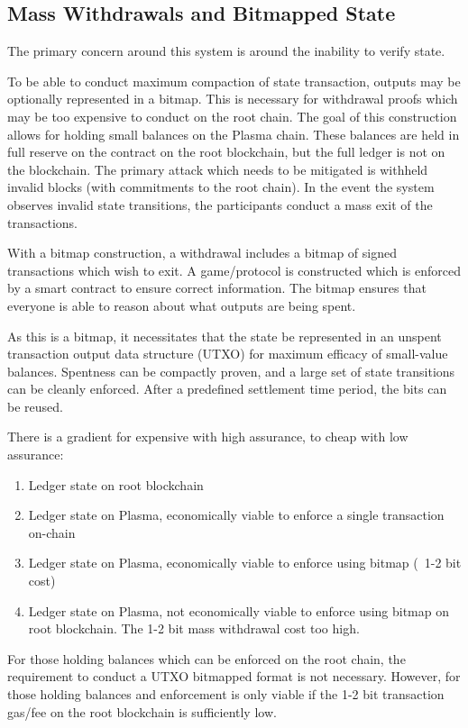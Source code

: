\documentclass[letterpaper, 11pt]{article}
\begin{document}
\subsection{Mass Withdrawals and Bitmapped State}

The primary concern around this system is around the inability to verify state. 

To be able to conduct maximum compaction of state transaction, outputs may be
optionally represented in a bitmap. This is necessary for withdrawal proofs
which may be too expensive to conduct on the root chain. The goal of this
construction allows for holding small balances on the Plasma chain. These
balances are held in full reserve on the contract on the root blockchain, but
the full ledger is not on the blockchain. The primary attack which needs to be
mitigated is withheld invalid blocks (with commitments to the root chain). In
the event the system observes invalid state transitions, the participants
conduct a mass exit of the transactions.

With a bitmap construction, a withdrawal includes a bitmap of signed
transactions which wish to exit. A game/protocol is constructed which is
enforced by a smart contract to ensure correct information. The bitmap ensures
that everyone is able to reason about what outputs are being spent.

As this is a bitmap, it necessitates that the state be represented in an unspent
transaction output data structure (UTXO) for maximum efficacy of small-value
balances. Spentness can be compactly proven, and a large set of state
transitions can be cleanly enforced. After a predefined settlement time period,
the bits can be reused.

There is a gradient for expensive with high assurance, to cheap with low
assurance:
\begin{enumerate}
	\item
		Ledger state on root blockchain
	\item
		Ledger state on Plasma, economically viable to enforce a single
		transaction on-chain
	\item
		Ledger state on Plasma, economically viable to enforce using
		bitmap (~1-2 bit cost)
	\item
		Ledger state on Plasma, not economically viable to enforce using
		bitmap on root blockchain. The 1-2 bit mass withdrawal cost too
		high.
\end{enumerate}

For those holding balances which can be enforced on the root chain,
the requirement to conduct a UTXO bitmapped format is not necessary. However,
for those holding balances and enforcement is only viable if the 1-2 bit
transaction gas/fee on the root blockchain is sufficiently low.
\end{document}
